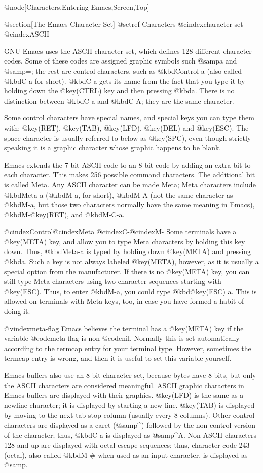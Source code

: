 {{@node[Characters,Entering Emacs,Screen,Top]

@section[The Emacs Character Set]
@setref Characters
@cindex{character set}
@cindex{ASCII}

  GNU Emacs uses the ASCII character set, which defines 128 different
character codes.  Some of these codes are assigned graphic symbols such
@samp{a} and @samp{=}; the rest are control characters, such as
@kbd{Control-a} (also called @kbd{C-a} for short).  @kbd{C-a} gets its name
from the fact that you type it by holding down the @key(CTRL) key and
then pressing @kbd{a}.  There is no distinction between @kbd{C-a} and
@kbd{C-A}; they are the same character.

  Some control characters have special names, and special keys you can
type them with: @key(RET), @key(TAB), @key(LFD), @key(DEL) and @key(ESC).
The space character is usually referred to below as @key(SPC), even though
strictly speaking it is a graphic character whose graphic happens to be
blank.

  Emacs extends the 7-bit ASCII code to an 8-bit code by adding an extra
bit to each character.  This makes 256 possible command characters.  The
additional bit is called Meta.  Any ASCII character can be made Meta; Meta
characters include @kbd{Meta-a} (@kbd{M-a}, for short), @kbd{M-A} (not the
same character as @kbd{M-a}, but those two characters normally have the
same meaning in Emacs), @kbd{M-@key(RET)}, and @kbd{M-C-a}.

@cindex{Control}@cindex{Meta}
@cindex{C-}@cindex{M-}
  Some terminals have a @key(META) key, and allow you to type Meta
characters by holding this key down.  Thus, @kbd{Meta-a} is typed by
holding down @key(META) and pressing @kbd{a}.  Such a key is not always
labeled @key(META), however, as it is usually a special option from the
manufacturer.  If there is no @key(META) key, you can still type Meta
characters using two-character sequences starting with @key(ESC).  Thus,
to enter @kbd{M-a}, you could type @kbd{@key(ESC) a}.  This is allowed
on terminals with Meta keys, too, in case you have formed a habit of doing
it.

@vindex{meta-flag}
  Emacs believes the terminal has a @key(META) key if the variable
@code{meta-flag} is non-@code{nil}.  Normally this is set automatically
according to the termcap entry for your terminal type.  However, sometimes
the termcap entry is wrong, and then it is useful to set this variable
yourself.

  Emacs buffers also use an 8-bit character set, because bytes have 8 bits,
but only the ASCII characters are considered meaningful.  ASCII graphic
characters in Emacs buffers are displayed with their graphics.
@key(LFD) is the same as a newline character; it is displayed by
starting a new line.  @key(TAB) is displayed by moving to the next tab stop
column (usually every 8 columns).  Other control characters are displayed
as a caret (@samp{^}) followed by the non-control version of the character;
thus, @kbd{C-a} is displayed as @samp{^A}.  Non-ASCII characters 128 and up
are displayed with octal escape sequences; thus, character code 243
(octal), also called @kbd{M-#} when used as an input character, is
displayed as @samp{}.

}}
